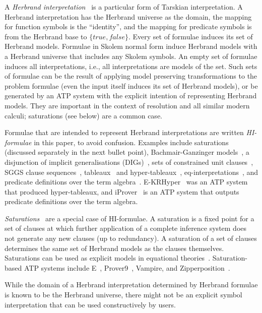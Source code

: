 \documentclass{easychair}
\newenvironment{packed_itemize}{
\vspace*{-0.3em}
\begin{itemize}
\setlength{\partopsep}{0pt}
\setlength{\itemsep}{1pt}
\setlength{\parskip}{0pt}
\setlength{\parsep}{0pt}
}{\end{itemize}}
\begin{document}
A \emph{Herbrand interpretation}~\cite{Her30} is a particular form of Tarskian interpretation.
A Herbrand interpretation has the Herbrand universe as the domain, the mapping for function symbols
is the ``identity'', and the mapping for predicate symbols is from the Herbrand base to 
$\{true,false\}$.
Every set of formulae induces its set of Herbrand models.
Formulae in Skolem normal form induce Herbrand models with a Herbrand universe that includes any 
Skolem symbols. 
An empty set of formulae induces all interpretations, i.e., all interpretations are models
of the set.
Such sets of formulae can be the result of applying model preserving transformations to the 
problem formulae (even the input itself induces its set of Herbrand models), or be generated 
by an ATP system with the explicit intention of representing Herbrand models.
They are important in the context of resolution and all similar modern calculi; saturations (see 
below) are a common case.
\begin{packed_itemize}
\item Formulae that are intended to represent Herbrand interpretations are written 
      \emph{HI-formulae} in this paper, to avoid confusion.
      Examples include saturations (discussed separately in the next bullet point), 
      Bachmair-Ganzinger models~\cite{BG94,Lyn13}, a disjunction of implicit generalisations 
      (DIGs)~\cite{LM87}, sets of constrained unit clauses~\cite{CZ92,CP95,CP95-TAB}, SGGS clause 
      sequences~\cite{BP16}, tableaux~\cite{Hah01}
      and hyper-tableaux~\cite{BFN96}, eq-interpretations~\cite{Pel03-EQMC}, and 
      predicate definitions over the term algebra~\cite{SK12}.
      E-KRHyper~\cite{PW07} was an ATP system that produced hyper-tableaux, and
      iProver~\cite{Kor08,SK12} is an ATP system that outputs predicate definitions 
      over the term algebra.
\item \emph{Saturations}~\cite{BG+01,Pel03-JSC} are a special case of HI-formulae.
      A saturation is a fixed point for a set of clauses at which further application of a
      complete inference system does not generate any new clauses (up to redundancy).
      A saturation of a set of clauses determines the same set of Herbrand models as 
      the clauses themselves.
      Saturations can be used as explicit models in equational theories~\cite{JRS26-arXiv}.
      Saturation-based ATP systems include E~\cite{SCV19}, Prover9~\cite{McC-Prover9-URL}, 
      Vampire, and Zipperposition~\cite{VB+21}.
\end{packed_itemize}
While the domain of a Herbrand interpretation determined by Herbrand formulae is known to be the 
Herbrand universe, there might not be an explicit symbol interpretation that can be used 
constructively by users.
\end{document}
